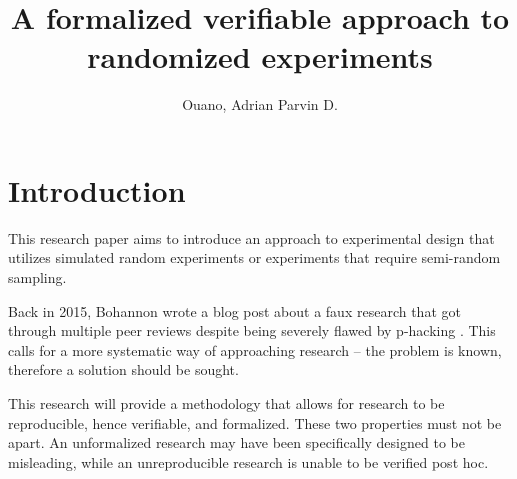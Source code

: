 \documentclass[twocolumn]{article}
\title{A formalized verifiable approach to randomized experiments}
\author{Ouano, Adrian Parvin D.}
\begin{document}
\maketitle

\section{Introduction}
This research paper aims to introduce an approach to experimental design that utilizes
simulated random experiments or experiments that require semi-random sampling.

Back in 2015, Bohannon wrote a blog post about
a faux research that got through multiple peer reviews
despite being severely flawed by p-hacking \cite{fooledchocolate}.
This calls for a more systematic way of approaching research --
the problem is known, therefore a solution should be sought.

This research will provide a methodology that allows for research to be reproducible, hence verifiable,
and formalized.
These two properties must not be apart.
An unformalized research may have been specifically designed to be misleading, while
an unreproducible research is unable to be verified post hoc.



\end{document}
